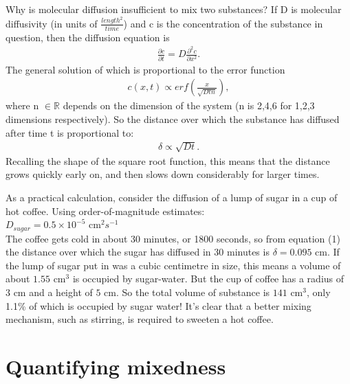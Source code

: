 \documentclass[a4paper,12pt]{article}
\begin{document}
Why is molecular diffusion insufficient to mix two substances? If D is molecular diffusivity (in units of $\frac{length^2}{time}$) and c is the concentration of the substance in question, then the diffusion equation is
\begin{align*}
\frac{\partial c}{\partial t} = D\frac{\partial^2 c}{\partial x^2}.
\end{align*} The general solution of which is proportional to the error function
\begin{align*}
c(x,t) \propto erf\left(\frac{x}{\sqrt{Dtn}}\right),
\end{align*} where n $\in \mathbb{R}$ depends on the dimension of the system (n is 2,4,6 for 1,2,3 dimensions respectively). So the distance over which the substance has diffused after time t is proportional to:
\begin{align}
\delta \propto \sqrt{Dt}.
\end{align}Recalling the shape of the square root function, this means that the distance grows quickly early on, and then slows down considerably for larger times. 

As a practical calculation, consider the diffusion of a lump of sugar in a cup of hot coffee. Using order-of-magnitude estimates:\\
$D_{sugar} = 0.5\times10^{-5}\text{ cm}^2s^{-1}$\citep[~p.1326]{hc09}\\
The coffee gets cold in about 30 minutes, or 1800 seconds, so from equation (1) the distance over which the sugar has diffused in 30 minutes is $\delta = 0.095\text{ cm}$. If the lump of sugar put in was a cubic centimetre in size, this means a volume of about $1.55\text{ cm}^3$ is occupied by sugar-water. But the cup of coffee has a radius of $3\text{ cm}$ and a height of $5\text{ cm}$. So the total volume of substance is $141\text{ cm}^3$, only 1.1\% of which is occupied by sugar water! It's clear that a better mixing mechanism, such as stirring, is required to sweeten a hot coffee.
\section{Quantifying mixedness}
\end{document}
